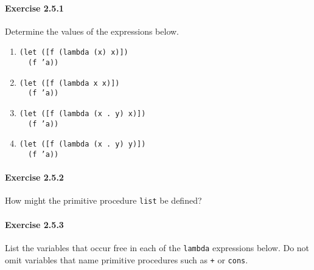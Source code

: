 \paragraph{Exercise \label{start_g22}2.5.1}


\label{start_s72}Determine the values of the expressions below.


 
 \begin{enumerate}[\it a. ]
\item 
\begin{alltt}
(let ([f (lambda (x) x)])
  (f 'a))
\end{alltt}

\item 
\begin{alltt}
(let ([f (lambda x x)])
  (f 'a))
\end{alltt}

\item 
\begin{alltt}
(let ([f (lambda (x . y) x)])
  (f 'a))
\end{alltt}

\item 
\begin{alltt}
(let ([f (lambda (x . y) y)])
  (f 'a))
\end{alltt}

\end{enumerate}




\paragraph{Exercise \label{start_g23}2.5.2}


\label{start_s73}How might the primitive procedure \texttt{list} be defined?




\paragraph{Exercise \label{start_g24}2.5.3}


\label{start_s74}List the variables that \label{start_s75}occur free in each of the \texttt{lambda}
expressions below.
Do not omit variables that name primitive procedures such as
\texttt{+} or \texttt{cons}.


